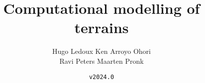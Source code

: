 \documentclass[
  fontsize=10pt, %
  twoside=true, %
  secnumdepth=1, %
  numbers=noenddot, %
]{kaobook}
\begin{document}


\title{Computational modelling of terrains}
\author{Hugo Ledoux \hspace{10mm} Ken Arroyo Ohori\\ Ravi Peters \hspace{17mm} Maarten Pronk}
\date{\texttt{v2024.0}}



\frontmatter %





\cleardoublepage







\maketitle

\end{document}
